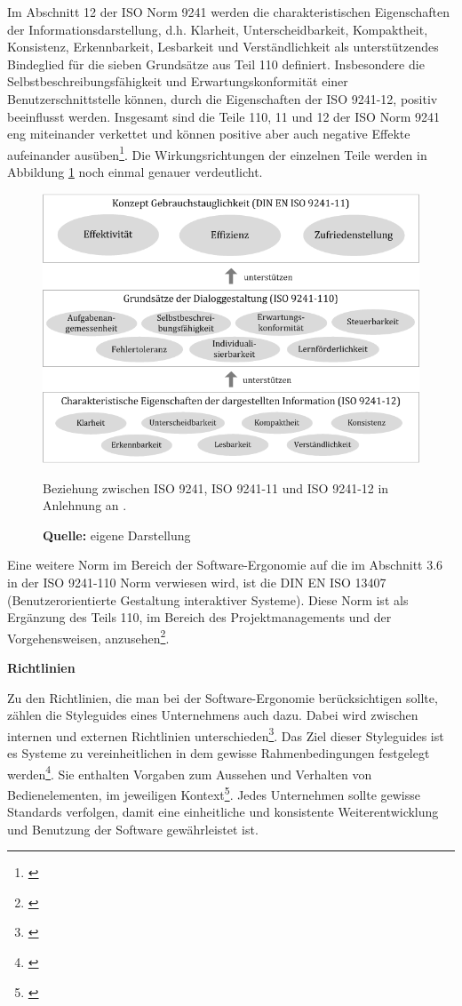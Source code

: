 Im Abschnitt 12 der ISO Norm 9241 werden die charakteristischen Eigenschaften der Informationsdarstellung, d.h. Klarheit, Unterscheidbarkeit, Kompaktheit, Konsistenz, Erkennbarkeit, Lesbarkeit und Verständlichkeit als unterstützendes Bindeglied für die sieben Grundsätze aus Teil 110 definiert. Insbesondere die Selbstbeschreibungsfähigkeit und Erwartungskonformität einer Benutzerschnittstelle können, durch die Eigenschaften der ISO 9241-12, positiv beeinflusst werden. Insgesamt sind die Teile 110, 11 und 12 der ISO Norm 9241 eng miteinander verkettet und können positive aber auch negative Effekte aufeinander ausüben\footnote{\cite[vgl.][Kap. 6]{ISO9241-110}}. Die Wirkungsrichtungen der einzelnen Teile werden in Abbildung \ref{fig:beziehungIsoNormen} noch einmal genauer verdeutlicht.
\begin{figure}[H]
  \centering
  \includegraphics[scale=0.85]{img/Beziehung_ISO9241_ISO9241-11_ISO9241-12.png}
  \caption{Beziehung zwischen ISO 9241, ISO 9241-11 und ISO 9241-12 in Anlehnung an \citep[]{ISO9241-110}.}
  \caption*{\textbf{Quelle:} eigene Darstellung}
  \label{fig:beziehungIsoNormen}
\end{figure}
Eine weitere Norm im Bereich der Software-Ergonomie auf die im Abschnitt 3.6 in der ISO 9241-110 Norm verwiesen wird, ist die DIN EN ISO 13407 (Benutzerorientierte Gestaltung interaktiver Systeme). Diese Norm ist als Ergänzung des Teils 110, im Bereich des Projektmanagements und der Vorgehensweisen, anzusehen\footnote{\cite[vgl.][58]{Schneider2008}}.

\textbf{Richtlinien}

Zu den Richtlinien, die man bei der Software-Ergonomie berücksichtigen sollte, zählen die Styleguides eines Unternehmens auch dazu. Dabei wird zwischen internen und externen Richtlinien unterschieden\footnote{\cite[vgl.][74]{Richter2013}}. Das Ziel dieser Styleguides ist es Systeme zu vereinheitlichen in dem gewisse Rahmenbedingungen festgelegt werden\footnote{\cite[vgl.][]{Sarodnick2011}}. Sie enthalten Vorgaben zum Aussehen und Verhalten von Bedienelementen, im jeweiligen Kontext\footnote{\cite[vgl.][72]{Richter2013}}. Jedes Unternehmen sollte gewisse Standards verfolgen, damit eine einheitliche und konsistente Weiterentwicklung und Benutzung der Software gewährleistet ist.

